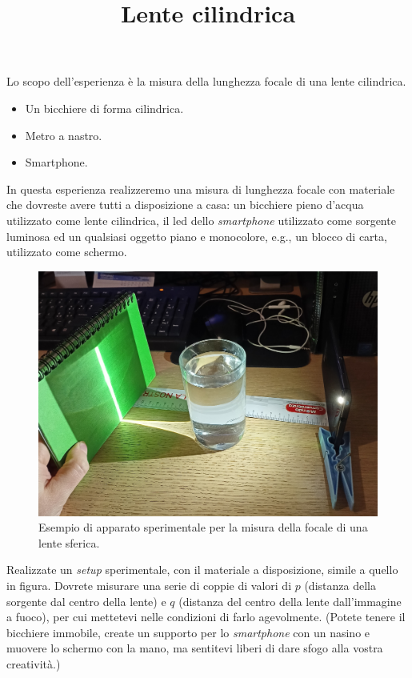 \documentclass{lab1-article}
\title{Lente cilindrica}
\begin{document}
\begin{article}

\maketitle

\secintro


Lo scopo dell'esperienza \`e la misura della lunghezza focale di una lente
cilindrica.


\secmaterialsdad

\begin{itemize}
\item Un bicchiere di forma cilindrica.
\item Metro a nastro.
\item Smartphone.
\end{itemize}


\secmeasurements

In questa esperienza realizzeremo una misura di lunghezza focale con materiale
che dovreste avere tutti a disposizione a casa: un bicchiere pieno d'acqua
utilizzato come lente cilindrica, il led dello \emph{smartphone} utilizzato
come sorgente luminosa ed un qualsiasi oggetto piano e monocolore, e.g., un
blocco di carta, utilizzato come schermo.

\begin{figure}[!htb]
  \includegraphics[width=\linewidth]{figures/lente_cilindrica}
  \caption{Esempio di apparato sperimentale per la misura della focale di una
  lente sferica.}
\end{figure}

Realizzate un \emph{setup} sperimentale, con il materiale a disposizione,
simile a quello in figura. Dovrete misurare una serie di coppie di valori di
$p$ (distanza della sorgente dal centro della lente) e $q$ (distanza del centro
della lente dall'immagine a fuoco), per cui mettetevi nelle condizioni di farlo
agevolmente. (Potete tenere il bicchiere immobile, create un supporto per lo
\emph{smartphone} con un nasino e muovere lo schermo con la mano, ma sentitevi
liberi di dare sfogo alla vostra creativit\`a.)


\end{article}
\end{document}
